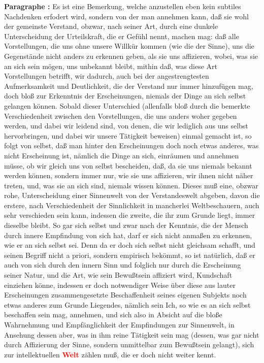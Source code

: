 \documentclass[a4paper,12pt,twoside]{book}
\newcommand{\match}[1]{\textcolor{red}{\textbf{#1}}}
\begin{document}
	\noindent\textbf{Paragraphe : }Es ist eine Bemerkung, welche anzustellen eben kein subtiles Nachdenken erfodert wird, sondern von der man annehmen kann, daß sie wohl der gemeinste Verstand, obzwar, nach seiner Art, durch eine dunkele Unterscheidung der Urteilskraft, die er Gefühl nennt, machen mag: daß alle Vorstellungen, die uns ohne unsere Willkür kommen (wie die der Sinne), uns die Gegenstände nicht anders zu erkennen geben, als sie uns affizieren, wobei, was sie an sich sein mögen, uns unbekannt bleibt, mithin daß, was diese Art Vorstellungen betrifft, wir dadurch, auch bei der angestrengtesten Aufmerksamkeit und Deutlichkeit, die der Verstand nur immer hinzufügen mag, doch bloß zur Erkenntnis der Erscheinungen, niemals der Dinge an sich selbst gelangen können. Sobald dieser Unterschied (allenfalls bloß durch die bemerkte Verschiedenheit zwischen den Vorstellungen, die uns anders woher gegeben werden, und dabei wir leidend sind, von denen, die wir lediglich aus uns selbst hervorbringen, und dabei wir unsere Tätigkeit beweisen) einmal gemacht ist, so folgt von selbst, daß man hinter den Erscheinungen doch noch etwas anderes, was nicht Erscheinung  ist, nämlich die Dinge an sich, einräumen und annehmen müsse, ob wir gleich uns von selbst bescheiden, daß, da sie uns niemals bekannt werden können, sondern immer nur, wie sie uns affizieren, wir ihnen nicht näher treten, und, was sie an sich sind, niemals wissen können. Dieses muß eine, obzwar rohe, Unterscheidung einer Sinnenwelt von der Verstandeswelt abgeben, davon die erstere, nach Verschiedenheit der Sinnlichkeit in mancherlei Weltbeschauern, auch sehr verschieden sein kann, indessen die zweite, die ihr zum Grunde liegt, immer dieselbe bleibt. So gar sich selbst und zwar nach der Kenntnis, die der Mensch durch innere Empfindung von sich hat, darf er sich nicht anmaßen zu erkennen, wie er an sich selbst sei. Denn da er doch sich selbst nicht gleichsam schafft, und seinen Begriff nicht a priori, sondern empirisch bekömmt, so ist natürlich, daß er auch von sich durch den innern Sinn und folglich nur durch die Erscheinung seiner Natur, und die Art, wie sein Bewußtsein affiziert wird, Kundschaft einziehen könne, indessen er doch notwendiger Weise über diese aus lauter Erscheinungen zusammengesetzte Beschaffenheit seines eigenen Subjekts noch etwas anderes zum Grunde Liegendes, nämlich sein Ich, so wie es an sich selbst beschaffen sein mag, annehmen, und sich also in Absicht auf die bloße Wahrnehmung und Empfänglichkeit der Empfindungen zur Sinnenwelt, in Ansehung dessen aber, was in ihm reine Tätigkeit sein mag (dessen, was gar nicht durch Affizierung der Sinne, sondern unmittelbar zum Bewußtsein gelangt), sich zur intellektuellen \match{Welt} zählen muß, die er doch nicht weiter kennt. 
	
\end{document}

